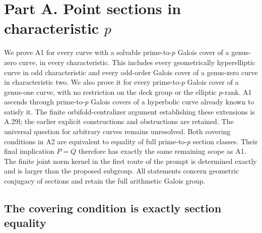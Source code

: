 \section{Part A. Point sections in characteristic \texorpdfstring{$p$}{p}}
\label{sec:partA}

We prove A1 for every curve with a solvable prime-to-$p$ Galois
cover of a genus-zero curve, in every characteristic. This includes
every geometrically hyperelliptic curve in odd characteristic and
every odd-order Galois cover of a genus-zero curve in characteristic
two. We also prove it for every prime-to-$p$ Galois cover of a
genus-one curve, with no restriction on the deck group or the
elliptic $p$-rank. A1 ascends through prime-to-$p$ Galois covers
of a hyperbolic curve already known to satisfy it. The finite
orbifold-centralizer argument establishing these extensions is
A.29l; the earlier explicit constructions and obstructions are
retained. The universal question for arbitrary curves remains
unresolved. Both covering conditions in A2 are
equivalent to equality of full prime-to-$p$ section classes. Their final
implication $P=Q$ therefore has exactly the same remaining scope as A1.
The finite joint norm kernel in the first route of the prompt is
determined exactly and is larger than the proposed subgroup. All
statements concern geometric conjugacy of sections and retain the full
arithmetic Galois group.

\subsection{The covering condition is exactly section equality}

